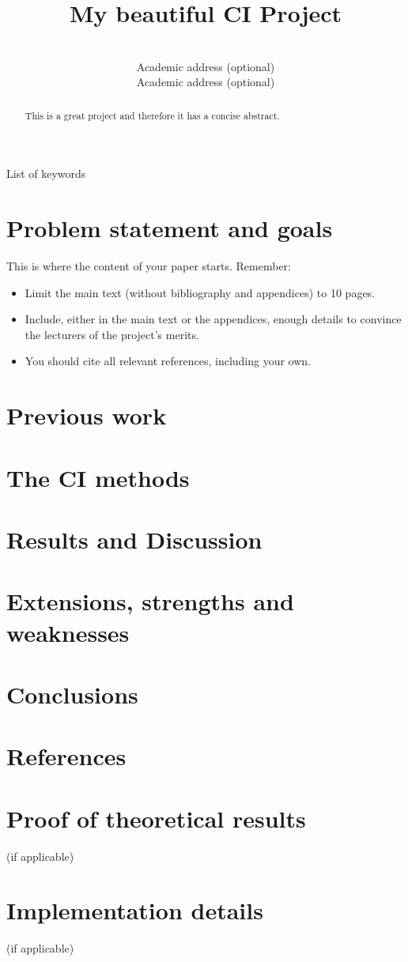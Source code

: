 \documentclass[anon]{CI}
\title[My CI Project]{My beautiful CI Project}
\author{\Name{Author Name1} \Email{abc@myemailaddress.com}\\
 \addr Academic address (optional)
 \AND
 \Name{Author Name2} \Email{xyz@myemailaddress.com}\\
 \addr Academic address (optional)
 }
\begin{document}
\maketitle

\begin{abstract}
This is a great project and therefore it has a concise abstract.
\end{abstract}

\begin{keywords}
List of keywords
\end{keywords}


\section{Problem statement and goals}

This is where the content of your paper starts. Remember:
\begin{itemize}
\item Limit the main text (without bibliography and appendices) to 10 pages.
\item Include, either in the main text or the appendices, enough details to convince the lecturers of the project's merits.
\item You should cite all relevant references, including your own.
\end{itemize}

\section{Previous work}

\section{The CI methods}

\section{Results and Discussion}

\section{Extensions, strengths and weaknesses}

\section{Conclusions}

\section*{References}




\appendix

\section{Proof of theoretical results} (if applicable)

\section{Implementation details} (if applicable)
\end{document}
